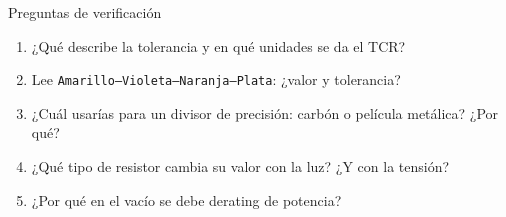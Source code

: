 \documentclass[aspectratio=169]{beamer}
\begin{document}
\begin{frame}{Preguntas de verificación}
  \begin{enumerate}
    \item ¿Qué describe la tolerancia y en qué unidades se da el TCR?
    \item Lee \texttt{Amarillo–Violeta–Naranja–Plata}: ¿valor y tolerancia?
    \item ¿Cuál usarías para un divisor de precisión: carbón o película metálica? ¿Por qué?
    \item ¿Qué tipo de resistor cambia su valor con la luz? ¿Y con la tensión?
    \item ¿Por qué en el vacío se debe derating de potencia?
  \end{enumerate}
\end{frame}
\end{document}
